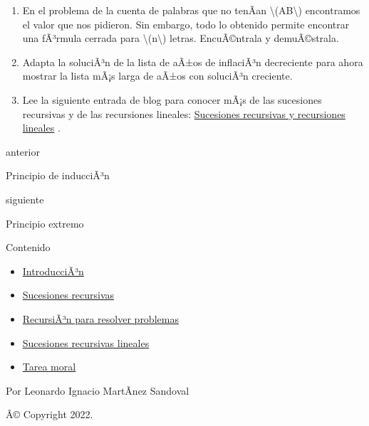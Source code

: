 \begin{enumerate}
  \begin{itemize}
  \item
    Ver que en efecto {\textbackslash(y\_n=2\^{}n\textbackslash)}.
  \item
    Ver que la sucesiÃ³n de {\textbackslash(a\_n\textbackslash)} es
    cÃ­clica.
  \item
    Ver que la sucesiÃ³n de {\textbackslash(b\_n\textbackslash)} puede
    ser tan grande como se quiere. Como sugerencia, pon a
    {\textbackslash(b\_\{n+4\}\textbackslash)} en tÃ©rminos de
    {\textbackslash(b\_\{n\},b\_\{n+1\},b\_\{n+2\}\textbackslash)} para
    mostrar que
    {\textbackslash(\textbar b\_\{n+4\}\textbar\textbackslash geq
    2\textbar b\_n\textbar\textbackslash)}.
  \end{itemize}
\item
  En el problema de la cuenta de palabras que no tenÃ­an
  {\textbackslash(AB\textbackslash)} encontramos el valor que nos
  pidieron. Sin embargo, todo lo obtenido permite encontrar una fÃ³rmula
  cerrada para {\textbackslash(n\textbackslash)} letras. EncuÃ©ntrala y
  demuÃ©strala.
\item
  Adapta la soluciÃ³n de la lista de aÃ±os de inflaciÃ³n decreciente
  para ahora mostrar la lista mÃ¡s larga de aÃ±os con soluciÃ³n
  creciente.
\item
  Lee la siguiente entrada de blog para conocer mÃ¡s de las sucesiones
  recursivas y de las recursiones lineales:
  \href{https://blog.nekomath.com/seminario-de-resolucion-de-problemas-sucesiones-recursivas-y-recursiones-lineales/}{Sucesiones
  recursivas y recursiones lineales} .
\end{enumerate}

\href{Induccion.html}{\emph{}}

anterior

Principio de inducciÃ³n

\href{Extremo.html}{}

siguiente

Principio extremo

\emph{}

\emph{} Contenido

\begin{itemize}
\tightlist
\item
  \hyperref[introduccion]{IntroducciÃ³n}
\item
  \hyperref[sucesiones-recursivas]{Sucesiones recursivas}
\item
  \hyperref[recursion-para-resolver-problemas]{RecursiÃ³n para resolver
  problemas}
\item
  \hyperref[sucesiones-recursivas-lineales]{Sucesiones recursivas
  lineales}
\item
  \hyperref[tarea-moral]{Tarea moral}
\end{itemize}

Por Leonardo Ignacio MartÃ­nez Sandoval

Â© Copyright 2022.\\
